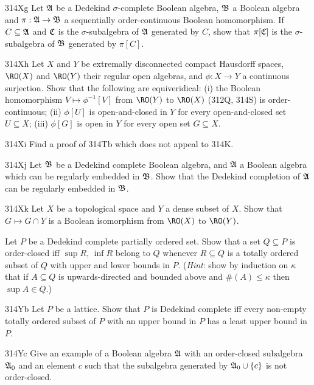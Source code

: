 {\sqheader 314Xg Let $\frak A$ be a Dedekind $\sigma$-complete Boolean
algebra, $\frak B$ a Boolean algebra and $\pi:\frak A\to\frak B$ a
sequentially order-continuous Boolean homomorphism.   If
$C\subseteq\frak A$ and
$\frak C$ is the $\sigma$-subalgebra of $\frak A$ generated by $C$, show
that $\pi[\frak C]$ is the $\sigma$-subalgebra of $\frak B$ generated by
$\pi[C]$.

\spheader 314Xh Let $X$ and $Y$ be extremally disconnected compact Hausdorff spaces,
$\RO(X)$ and $\RO(Y)$ their regular open algebras,
and $\phi:X\to Y$ a continuous surjection.   Show that the following are
equiveridical:  (i) the Boolean homomorphism $V\mapsto\phi^{-1}[V]$ from
$\RO(Y)$ to $\RO(X)$ (312Q, 314S) is order-continuous;
(ii) $\phi[U]$ is open-and-closed in $Y$ for every open-and-closed set
$U\subseteq X$;  (iii) $\phi[G]$ is open in $Y$ for every open set $G\subseteq X$.

\spheader 314Xi Find a proof of 314Tb which does not appeal to 314K.

\spheader 314Xj Let $\frak B$ be a Dedekind complete Boolean algebra, and
$\frak A$ a Boolean algebra which can be regularly embedded in $\frak B$.
Show that the Dedekind completion of $\frak A$ can be regularly embedded in
$\frak B$.

\spheader 314Xk
Let $X$ be a topological space and $Y$ a dense subset of
$X$.   Show that $G\mapsto G\cap Y$ is a Boolean isomorphism from
$\RO(X)$ to $\RO(Y)$.

Let $P$ be a Dedekind complete partially ordered set.   Show that a set
$Q\subseteq P$ is order-closed iff $\sup R$, $\inf R$ belong to $Q$
whenever $R\subseteq Q$ is a totally ordered subset of $Q$ with upper
and lower bounds in $P$.   ({\it Hint\/}:  show by induction on $\kappa$
that if $A\subseteq Q$ is upwards-directed and bounded above and
$\#(A)\le\kappa$ then $\sup A\in Q$.)

\spheader 314Yb Let $P$ be a lattice.   Show that $P$ is Dedekind
complete iff every non-empty totally ordered subset of $P$ with an upper
bound in $P$ has a least upper bound in $P$.   

\spheader 314Yc Give an example of a Boolean
algebra $\frak A$ with an order-closed subalgebra $\frak A_0$ and an
element $c$ such that the subalgebra generated by $\frak A_0\cup\{c\}$
is not order-closed.

}
